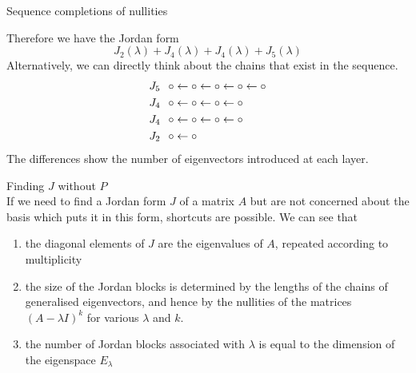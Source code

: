 \documentclass[journal, letterpaper]{IEEEtran}
\begin{document}
\begin{myboxg}{Sequence completions of nullities}
\begin{enumerate}
        \end{enumerate}
        Therefore we have the Jordan form
        $$ J_2(\lambda) + J_4(\lambda) + J_4(\lambda) + J_5(\lambda)$$
        Alternatively, we can directly think about the chains that exist in the sequence.
        \begin{align*}
            J_5 \hspace{0.25cm} &\circ \leftarrow \circ \leftarrow \circ \leftarrow \circ \leftarrow \circ \\
            J_4 \hspace{0.25cm} &\circ \leftarrow \circ \leftarrow \circ \leftarrow \circ \\ 
            J_4 \hspace{0.25cm} &\circ \leftarrow \circ \leftarrow \circ \leftarrow \circ \\ 
            J_2 \hspace{0.25cm} &\circ \leftarrow \circ
        \end{align*}
        The differences show the number of eigenvectors introduced at each layer.
    \end{myboxg}
    \begin{myboxr}{Finding $J$ without $P$} \\
        If we need to find a Jordan form $J$ of a matrix $A$ but are not concerned 
        about the basis which puts it in this form, shortcuts are possible. We can 
        see that
        \begin{enumerate}
            \item the diagonal elements of $J$ are the eigenvalues of $A$, repeated according 
            to multiplicity
            \item the size of the Jordan blocks is determined by the lengths of the chains 
            of generalised eigenvectors, and hence by the nullities of the matrices 
            $(A - \lambda I)^k$ for various $\lambda$ and $k$.
            \item the number of Jordan blocks associated with $\lambda$ is equal to the
            dimension of the eigenspace $E_\lambda$
        \end{enumerate}
    \end{myboxr}
\end{document}
